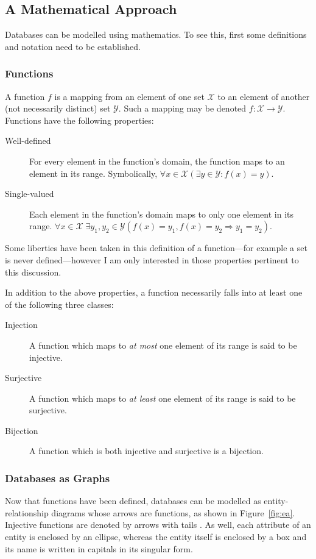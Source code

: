 \documentclass[11pt,a4paper]{report}
\begin{document}
	\subsection{A Mathematical Approach}
	Databases can be modelled using mathematics. To see this, first some definitions and notation need to be established.
	
	\subsubsection{Functions}
	A function $f$ is a mapping from an element of one set $\mathcal{X}$ to an element of another (not necessarily distinct) set $\mathcal{Y}$. Such a mapping may be denoted $f : \mathcal{X} \rightarrow \mathcal{Y}$. Functions have the following properties:
	\begin{description}
		\item[Well-defined] For every element in the function's domain, the function maps to an element in its range. Symbolically, $\forall x \in \mathcal{X} (\exists y \in \mathcal{Y} : f(x) = y)$.
		\item[Single-valued] Each element in the function's domain maps to only one element in its range. $\forall x \in \mathcal{X} \; \exists y_1, y_2 \in \mathcal{Y} (f(x) = y_1, f(x) = y_2 \Longrightarrow y_1 = y_2)$.
	\end{description}
	Some liberties have been taken in this definition of a function---for example a set is never defined---however I am only interested in those properties pertinent to this discussion.
	
	In addition to the above properties, a function necessarily falls into at least one of the following three classes:
	\begin{description}
		\item[Injection] A function which maps to \textit{at most} one element of its range is said to be injective.
		\item[Surjective] A function which maps to \textit{at least} one element of its range is said to be surjective.
		\item[Bijection] A function which is both injective and surjective is a bijection.
	\end{description}
	
	\subsubsection{Databases as Graphs}
	Now that functions have been defined, databases can be modelled as entity-relationship diagrams whose arrows are functions, as shown in Figure~\ref{fig:ea}. Injective functions are denoted by arrows with tails \raisebox{-1pt}{\Large $ \rightarrowtail$}. As well, each attribute of an entity is enclosed by an ellipse, whereas the entity itself is enclosed by a box and its name is written in capitals in its singular form.
	
\end{document}
